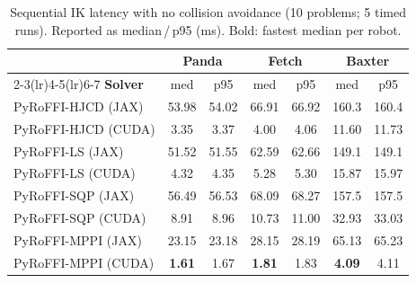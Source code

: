 \begin{table}[t]
\centering
\caption{Sequential IK latency with no collision avoidance (10 problems; 5 timed runs). Reported as median\,/\,p95 (ms). Bold: fastest median per robot.}
\label{tab:ik_seq_nocoll}
\small
\begin{tabular}{lcccccc}
\toprule
\multicolumn{1}{c}{} & \multicolumn{2}{c}{\textbf{Panda}} & \multicolumn{2}{c}{\textbf{Fetch}} & \multicolumn{2}{c}{\textbf{Baxter}} \\
\cmidrule(lr){2-3}\cmidrule(lr){4-5}\cmidrule(lr){6-7}
\textbf{Solver} & med & p95 & med & p95 & med & p95 \\
\midrule
PyRoFFI-HJCD (JAX) & 53.98 & 54.02 & 66.91 & 66.92 & 160.3 & 160.4 \\
PyRoFFI-HJCD (CUDA) & 3.35 & 3.37 & 4.00 & 4.06 & 11.60 & 11.73 \\
\midrule
PyRoFFI-LS (JAX) & 51.52 & 51.55 & 62.59 & 62.66 & 149.1 & 149.1 \\
PyRoFFI-LS (CUDA) & 4.32 & 4.35 & 5.28 & 5.30 & 15.87 & 15.97 \\
\midrule
PyRoFFI-SQP (JAX) & 56.49 & 56.53 & 68.09 & 68.27 & 157.5 & 157.5 \\
PyRoFFI-SQP (CUDA) & 8.91 & 8.96 & 10.73 & 11.00 & 32.93 & 33.03 \\
\midrule
PyRoFFI-MPPI (JAX) & 23.15 & 23.18 & 28.15 & 28.19 & 65.13 & 65.23 \\
PyRoFFI-MPPI (CUDA) & \textbf{1.61} & 1.67 & \textbf{1.81} & 1.83 & \textbf{4.09} & 4.11 \\
\midrule
\midrule
\bottomrule
\end{tabular}
\end{table}